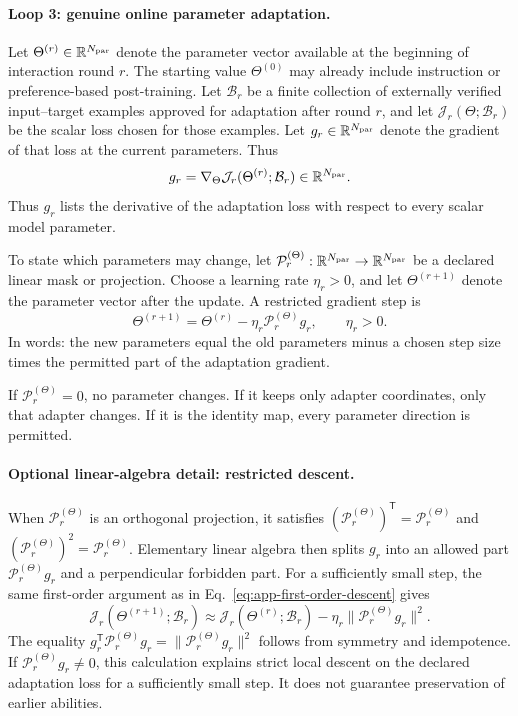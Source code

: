 \documentclass[
  aps,
  reprint,
  superscriptaddress,
  floatfix,
  nofootinbib,
  longbibliography
]{revtex4-2}
\newcommand{\R}{\mathbb{R}}
\newcommand{\T}{^{\mathsf{T}}}
\newcommand{\norm}[1]{\lVert #1 \rVert}
\begin{document}
\paragraph{Loop 3: genuine online parameter adaptation.}
Let $\Theta^{(r)}\in\R^{N_{\rm par}}$ denote the parameter vector available at
the beginning of interaction round $r$.  The starting value $\Theta^{(0)}$ may
already include instruction or preference-based post-training.  Let
$\mathcal B_r$ be a finite collection of externally verified input--target
examples approved for adaptation after round $r$, and let
$\mathcal J_r(\Theta;\mathcal B_r)$ be the scalar loss chosen for those
examples.  Let $g_r\in\R^{N_{\rm par}}$ denote the gradient of that loss at the
current parameters.  Thus
\begin{equation}
\label{eq:app-online-gradient}
g_r=\nabla_\Theta
\mathcal J_r(\Theta^{(r)};\mathcal B_r)
\in\R^{N_{\rm par}}.
\end{equation}
Thus $g_r$ lists the derivative of the adaptation loss with respect to every
scalar model parameter.

To state which parameters may change, let
$\mathcal P_r^{(\Theta)}:\R^{N_{\rm par}}\to\R^{N_{\rm par}}$ be a declared
linear mask or projection.  Choose a learning rate $\eta_r>0$, and let
$\Theta^{(r+1)}$ denote the parameter vector after the update.  A restricted
gradient step is
\begin{equation}
\label{eq:app-online-update}
\Theta^{(r+1)}
=\Theta^{(r)}-\eta_r\mathcal P_r^{(\Theta)}g_r,
\qquad \eta_r>0.
\end{equation}
In words: the new parameters equal the old parameters minus a chosen step size
times the permitted part of the adaptation gradient.

If $\mathcal P_r^{(\Theta)}=0$, no parameter changes.  If it keeps only adapter
coordinates, only that adapter changes.  If it is the identity map, every
parameter direction is permitted.

\paragraph{Optional linear-algebra detail: restricted descent.}
When $\mathcal P_r^{(\Theta)}$ is an orthogonal projection, it satisfies
$(\mathcal P_r^{(\Theta)})\T=\mathcal P_r^{(\Theta)}$ and
$(\mathcal P_r^{(\Theta)})^2=\mathcal P_r^{(\Theta)}$.  Elementary linear
algebra then splits $g_r$ into an allowed part
$\mathcal P_r^{(\Theta)}g_r$ and a perpendicular forbidden part.  For a
sufficiently small step, the same first-order argument as in
Eq.~\eqref{eq:app-first-order-descent} gives
\begin{equation}
\label{eq:app-restricted-descent}
\mathcal J_r(\Theta^{(r+1)};\mathcal B_r)
\approx
\mathcal J_r(\Theta^{(r)};\mathcal B_r)
-\eta_r\norm{\mathcal P_r^{(\Theta)}g_r}^{2}.
\end{equation}
The equality $g_r\T\mathcal P_r^{(\Theta)}g_r
=\norm{\mathcal P_r^{(\Theta)}g_r}^{2}$ follows from symmetry and
idempotence.  If $\mathcal P_r^{(\Theta)}g_r\ne0$, this calculation explains
strict local descent on the declared adaptation loss for a sufficiently small
step.  It does not guarantee preservation of earlier abilities.
\end{document}
